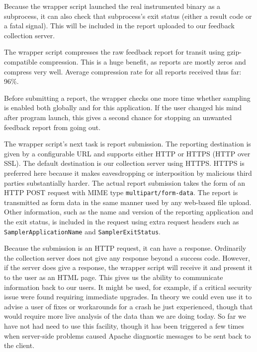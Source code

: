 \documentclass[10pt,twocolumn]{article}
\begin{document}
Because the wrapper script launched the real instrumented binary as a
subprocess, it can also check that subprocess's exit status (either a
result code or a fatal signal).  This will be included in the report
uploaded to our feedback collection server.

The wrapper script compresses the raw feedback report for transit
using gzip-compatible compression.  This is a huge benefit, as reports
are mostly zeros and compress very well.  Average compression rate for
all reports received thus far: 96\%.

Before submitting a report, the wrapper checks one more time whether
sampling is enabled both globally and for this application.  If the
user changed his mind after program launch, this gives a second chance
for stopping an unwanted feedback report from going out.

The wrapper script's next task is report submission.  The reporting
destination is given by a configurable URL and supports either HTTP or
HTTPS (HTTP over SSL).  The default destination is our collection
server using HTTPS.  HTTPS is preferred here because it makes
eavesdropping or interposition by malicious third parties
substantially harder.  The actual report submission takes the form of
an HTTP POST request with MIME type \texttt{multipart/form-data}.  The
report is transmitted as form data in the same manner used by any
web-based file upload.  Other information, such as the name and
version of the reporting application and the exit status, is included
in the request using extra request headers such as
\texttt{SamplerApplicationName} and \texttt{SamplerExitStatus}.

Because the submission is an HTTP request, it can have a response.
Ordinarily the collection server does not give any response beyond a
success code.  However, if the server does give a response, the
wrapper script will receive it and present it to the user as an HTML
page.  This gives us the ability to communicate information back to
our users.  It might be used, for example, if a critical security
issue were found requiring immediate upgrades.  In theory we could
even use it to advise a user of fixes or workarounds for a crash he
just experienced, though that would require more live analysis of the
data than we are doing today.  So far we have not had need to use this
facility, though it has been triggered a few times when server-side
problems caused Apache diagnostic messages to be sent back to the
client.
\end{document}
